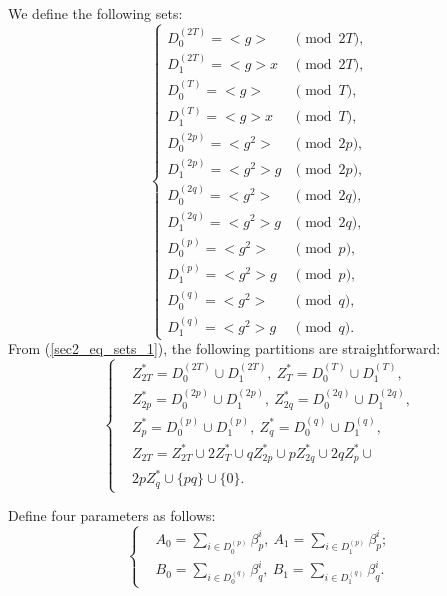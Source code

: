 \documentclass{mcom-l}
\theoremstyle{definition}
\numberwithin{equation}{section}
\begin{document}
 We define the following sets:
 \begin{equation}\label{sec2_eq_sets_1}
 \begin{cases}
 D_{0}^{(2T)}=<g> &\pmod {2T},\\
 D_{1}^{(2T)}=<g>x &\pmod {2T},\\
 D_{0}^{(T)}=<g> &\pmod {T},\\
 D_{1}^{(T)}=<g>x &\pmod {T},\\
 D_{0}^{(2p)}=<g^{2}> &\pmod {2p},\\
 D_{1}^{(2p)}=<g^{2}>g &\pmod {2p},\\
 D_{0}^{(2q)}=<g^{2}> &\pmod {2q},\\
 D_{1}^{(2q)}=<g^{2}>g &\pmod {2q},\\
 D_{0}^{(p)}=<g^{2}> &\pmod {p},\\
 D_{1}^{(p)}=<g^{2}>g &\pmod {p},\\
 D_{0}^{(q)}=<g^{2}> &\pmod {q},\\
 D_{1}^{(q)}=<g^{2}>g &\pmod {q}.
 \end{cases}
 \end{equation}
 From (\ref{sec2_eq_sets_1}), the following partitions are straightforward:
 \begin{equation}\label{sec2_eq_sets_2}
 \begin{cases}
 &Z^{*}_{2T}=D_{0}^{(2T)}\cup D_{1}^{(2T)},\ Z^{*}_{T}=D_{0}^{(T)}\cup D_{1}^{(T)},\\
 &Z^{*}_{2p}=D_{0}^{(2p)}\cup D_{1}^{(2p)},\ Z^{*}_{2q}=D_{0}^{(2q)}\cup D_{1}^{(2q)},\\
 &Z^{*}_{p}=D_{0}^{(p)}\cup D_{1}^{(p)},\ 
 Z^{*}_{q}=D_{0}^{(q)}\cup D_{1}^{(q)},\\
 &Z_{2T}=Z^{*}_{2T}\cup 2Z^{*}_{T}\cup 
 qZ^{*}_{2p}\cup pZ^{*}_{2q}
 \cup 2qZ^{*}_{p}\cup\\ 
 &2pZ^{*}_{q}
 \cup \lbrace pq\rbrace \cup \lbrace 0\rbrace.
 \end{cases}
 \end{equation}
 
 Define four parameters as follows:
 \begin{equation}\label{sec2_eq_parameters}
 \begin{cases}
 &A_{0}= \sum_{i\in D_{0}^{(p)}}\beta^{i}_{p},
 \ A_{1}= \sum_{i\in D_{1}^{(p)}}\beta^{i}_{p};\\
 &B_{0}= \sum_{i\in D_{0}^{(q)}}\beta^{i}_{q},
 \ B_{1}= \sum_{i\in D_{1}^{(q)}}\beta^{i}_{q}.
 \end{cases}
 \end{equation}
 
\end{document}
